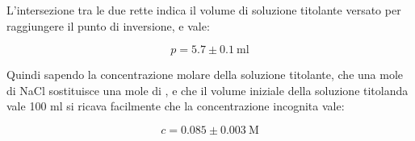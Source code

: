 L'intersezione tra le due rette indica il volume di soluzione titolante versato per raggiungere
il punto di inversione, e vale:

\begin{equation*}
    p = 5.7 \pm 0.1 ~ \si{\milli\litre}
\end{equation*}

Quindi sapendo la concentrazione molare della soluzione titolante, che una mole di NaCl sostituisce una mole di ,
e che il volume iniziale della soluzione titolanda vale 100 ml si ricava facilmente che la concentrazione incognita vale:

\begin{equation*}
    c = 0.085 \pm 0.003 ~ \text{M}
\end{equation*}

